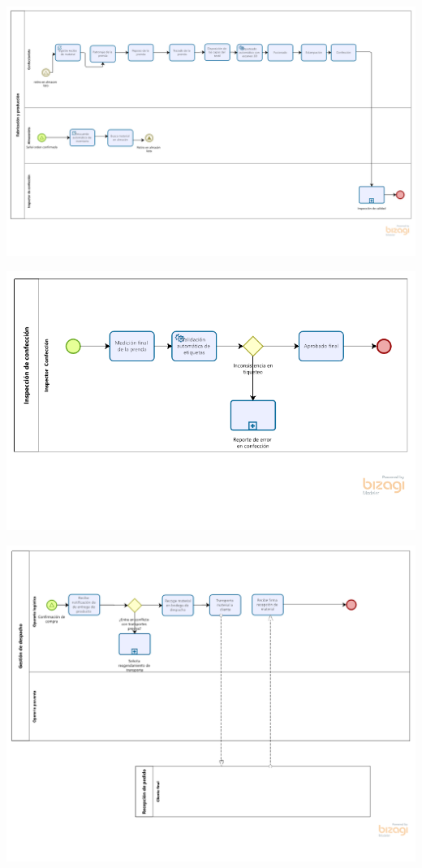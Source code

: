 \documentclass[11pt]{article}
\begin{document}
\begin{center}
\includegraphics[width=.9\linewidth]{./assets/build/to_be/fabricacion_produccion.png}
\end{center}

\begin{center}
\includegraphics[width=.9\linewidth]{./assets/build/to_be/inspeccion_confeccion.png}
\end{center}

\begin{center}
\includegraphics[width=.9\linewidth]{./assets/build/to_be/gestion_despacho.png}
\end{center}
\end{document}
